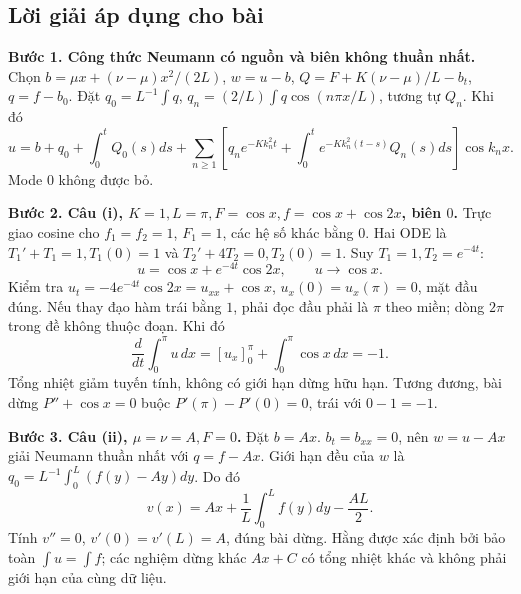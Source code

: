 \documentclass[10pt,a4paper]{article}
\begin{document}
\subsection*{Lời giải áp dụng cho bài}
\textbf{Bước 1. Công thức Neumann có nguồn và biên không thuần nhất.}
Chọn $b=\mu x+(\nu-\mu)x^2/(2L)$, $w=u-b$, $Q=F+K(\nu-\mu)/L-b_t$, $q=f-b_0$. Đặt $q_0=L^{-1}\int q$, $q_n=(2/L)\int q\cos(n\pi x/L)$, tương tự $Q_n$. Khi đó
\[u=b+q_0+\int_0^tQ_0(s)ds+
\sum_{n\ge1}\left[q_ne^{-Kk_n^2t}+
\int_0^te^{-Kk_n^2(t-s)}Q_n(s)ds\right]\cos k_nx.\]
Mode $0$ không được bỏ.

\textbf{Bước 2. Câu (i), $K=1,L=\pi,F=\cos x,f=\cos x+\cos2x$, biên $0$.}
Trực giao cosine cho $f_1=f_2=1$, $F_1=1$, các hệ số khác bằng $0$. Hai ODE là $T_1'+T_1=1,T_1(0)=1$ và $T_2'+4T_2=0,T_2(0)=1$. Suy $T_1=1,T_2=e^{-4t}$:
\[u=\cos x+e^{-4t}\cos2x,\qquad u\to\cos x.\]
Kiểm tra $u_t=-4e^{-4t}\cos2x=u_{xx}+\cos x$, $u_x(0)=u_x(\pi)=0$, mặt đầu đúng.
Nếu thay đạo hàm trái bằng $1$, phải đọc đầu phải là $\pi$ theo miền; dòng $2\pi$ trong đề không thuộc đoạn. Khi đó
\[\frac d{dt}\int_0^\pi u\,dx=[u_x]_0^\pi+\int_0^\pi\cos x\,dx=-1.\]
Tổng nhiệt giảm tuyến tính, không có giới hạn dừng hữu hạn. Tương đương, bài dừng $P''+\cos x=0$ buộc $P'(\pi)-P'(0)=0$, trái với $0-1=-1$.

\textbf{Bước 3. Câu (ii), $\mu=\nu=A,F=0$.}
Đặt $b=Ax$. $b_t=b_{xx}=0$, nên $w=u-Ax$ giải Neumann thuần nhất với $q=f-Ax$. Giới hạn đều của $w$ là $q_0=L^{-1}\int_0^L(f(y)-Ay)dy$. Do đó
\[v(x)=Ax+\frac1L\int_0^Lf(y)dy-\frac{AL}2.\]
Tính $v''=0$, $v'(0)=v'(L)=A$, đúng bài dừng. Hằng được xác định bởi bảo toàn $\int u=\int f$; các nghiệm dừng khác $Ax+C$ có tổng nhiệt khác và không phải giới hạn của cùng dữ liệu.
\end{document}

